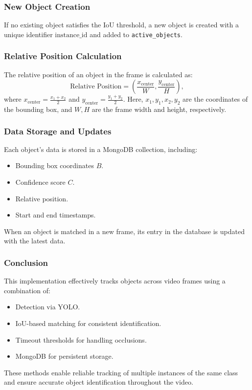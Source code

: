 \documentclass[conference]{IEEEtran}
\begin{document}
\subsubsection{New Object Creation}
If no existing object satisfies the IoU threshold, a new object is created with a unique identifier $\text{instance\_id}$ and added to \texttt{active\_objects}.

\subsubsection{Relative Position Calculation}
The relative position of an object in the frame is calculated as:
\begin{equation}
\text{Relative Position} = \left( \frac{x_{\text{center}}}{W}, \frac{y_{\text{center}}}{H} \right),
\end{equation}
where $x_{\text{center}} = \frac{x_1 + x_2}{2}$ and $y_{\text{center}} = \frac{y_1 + y_2}{2}$. Here, $x_1, y_1, x_2, y_2$ are the coordinates of the bounding box, and $W, H$ are the frame width and height, respectively.

\subsubsection{Data Storage and Updates}
Each object’s data is stored in a MongoDB collection, including:
\begin{itemize}
    \item Bounding box coordinates $B$.
    \item Confidence score $C$.
    \item Relative position.
    \item Start and end timestamps.
\end{itemize}

When an object is matched in a new frame, its entry in the database is updated with the latest data.

\subsubsection{Conclusion}
This implementation effectively tracks objects across video frames using a combination of:
\begin{itemize}
    \item Detection via YOLO.
    \item IoU-based matching for consistent identification.
    \item Timeout thresholds for handling occlusions.
    \item MongoDB for persistent storage.
\end{itemize}
These methods enable reliable tracking of multiple instances of the same class and ensure accurate object identification throughout the video.
\end{document}
